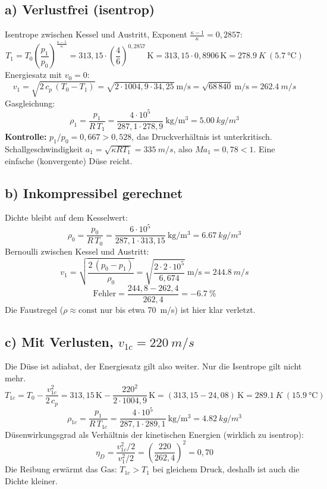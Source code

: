 \documentclass[11pt,a4paper]{article}
\begin{document}
\subsection*{a) Verlustfrei (isentrop)}

Isentrope zwischen Kessel und Austritt, Exponent $\frac{\kappa - 1}{\kappa} = 0{,}2857$:
\[
T_1 = T_0\left(\frac{p_1}{p_0}\right)^{\frac{\kappa-1}{\kappa}} = 313{,}15\cdot\left(\frac{4}{6}\right)^{0{,}2857}\,\mathrm{K} = 313{,}15\cdot 0{,}8906\,\mathrm{K} = \SI{278.9}{K}\ (\SI{5.7}{\celsius})
\]
Energiesatz mit $v_0 = 0$:
\[
v_1 = \sqrt{2\,c_p\,(T_0 - T_1)} = \sqrt{2\cdot 1004{,}9\cdot 34{,}25}\ \mathrm{m/s} = \sqrt{68\,840}\ \mathrm{m/s} = \SI{262.4}{m/s}
\]
Gasgleichung:
\[
\rho_1 = \frac{p_1}{R\,T_1} = \frac{4\cdot 10^5}{287{,}1\cdot 278{,}9}\ \mathrm{kg/m^3} = \SI{5.00}{kg/m^3}
\]
\textbf{Kontrolle:} $p_1/p_0 = 0{,}667 > 0{,}528$, das Druckverhältnis ist unterkritisch. Schallgeschwindigkeit $a_1 = \sqrt{\kappa R T_1} = \SI{335}{m/s}$, also $Ma_1 = 0{,}78 < 1$. Eine einfache (konvergente) Düse reicht.

\subsection*{b) Inkompressibel gerechnet}

Dichte bleibt auf dem Kesselwert:
\[
\rho_0 = \frac{p_0}{R\,T_0} = \frac{6\cdot 10^5}{287{,}1\cdot 313{,}15}\ \mathrm{kg/m^3} = \SI{6.67}{kg/m^3}
\]
Bernoulli zwischen Kessel und Austritt:
\[
v_1 = \sqrt{\frac{2\,(p_0 - p_1)}{\rho_0}} = \sqrt{\frac{2\cdot 2\cdot 10^5}{6{,}674}}\ \mathrm{m/s} = \SI{244.8}{m/s}
\]
\[
\text{Fehler} = \frac{244{,}8 - 262{,}4}{262{,}4} = \SI{-6.7}{\percent}
\]
Die Faustregel ($\rho \approx \text{const}$ nur bis etwa \SI{70}{m/s}) ist hier klar verletzt.

\subsection*{c) Mit Verlusten, $v_{1c} = \SI{220}{m/s}$}

Die Düse ist adiabat, der Energiesatz gilt also weiter. Nur die Isentrope gilt nicht mehr.
\[
T_{1c} = T_0 - \frac{v_{1c}^2}{2\,c_p} = 313{,}15\,\mathrm{K} - \frac{220^2}{2\cdot 1004{,}9}\,\mathrm{K} = (313{,}15 - 24{,}08)\,\mathrm{K} = \SI{289.1}{K}\ (\SI{15.9}{\celsius})
\]
\[
\rho_{1c} = \frac{p_1}{R\,T_{1c}} = \frac{4\cdot 10^5}{287{,}1\cdot 289{,}1}\ \mathrm{kg/m^3} = \SI{4.82}{kg/m^3}
\]
Düsenwirkungsgrad als Verhältnis der kinetischen Energien (wirklich zu isentrop):
\[
\eta_D = \frac{v_{1c}^2/2}{v_1^2/2} = \left(\frac{220}{262{,}4}\right)^2 = 0{,}70
\]
Die Reibung erwärmt das Gas: $T_{1c} > T_1$ bei gleichem Druck, deshalb ist auch die Dichte kleiner.
\end{document}
